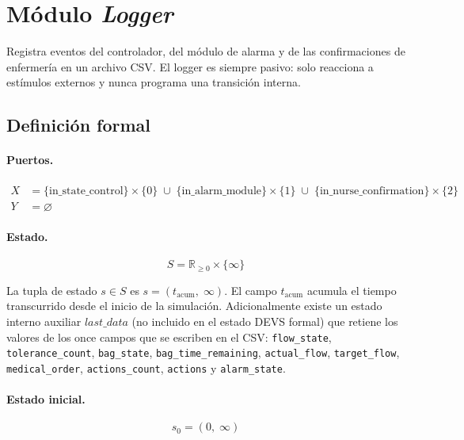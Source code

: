 \section{Módulo \emph{Logger}}

Registra eventos del controlador, del módulo de alarma y de las confirmaciones de enfermería en un archivo CSV. El logger es siempre pasivo: solo reacciona a estímulos externos y nunca programa una transición interna.

\subsection{Definición formal}

\paragraph{Puertos.}

\begin{align*}
  X &=
      \{ \mathrm{in\_state\_control} \} \times \{ 0 \}
      \;\cup\;
      \{ \mathrm{in\_alarm\_module} \} \times \{ 1 \}
      \;\cup\;
      \{ \mathrm{in\_nurse\_confirmation} \} \times \{ 2 \} \\[4pt]
  Y &= \varnothing
\end{align*}

\paragraph{Estado.}

\[
  S = \mathbb{R}_{\ge 0} \times \{ \infty \}
\]

La tupla de estado $s \in S$ es $s = (t_{\mathrm{acum}},\; \infty)$. El campo $t_{\mathrm{acum}}$ acumula el tiempo transcurrido desde el inicio de la simulación. Adicionalmente existe un estado interno auxiliar $\mathit{last\_data}$ (no incluido en el estado DEVS formal) que retiene los valores de los once campos que se escriben en el CSV: \texttt{flow\_state}, \texttt{tolerance\_count}, \texttt{bag\_state}, \texttt{bag\_time\_remaining}, \texttt{actual\_flow}, \texttt{target\_flow}, \texttt{medical\_order}, \texttt{actions\_count}, \texttt{actions} y \texttt{alarm\_state}.

\paragraph{Estado inicial.}

\[
  s_0 = (0,\; \infty)
\]


